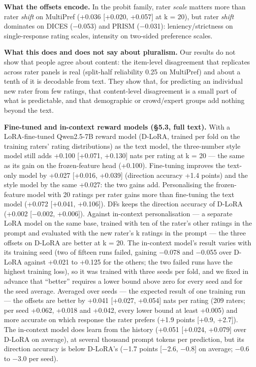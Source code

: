 \documentclass{article}
\begin{document}
\textbf{What the offsets encode.} In the probit family, rater \emph{scale} matters more than rater \emph{shift} on MultiPref (+0.036 {[}+0.020, +0.057{]} at k = 20), but rater \emph{shift} dominates on DICES ($-$0.053) and PRISM ($-$0.031): leniency/strictness on single-response rating scales, intensity on two-sided preference scales.

\textbf{What this does and does not say about pluralism.} Our results do not show that people agree about content: the item-level disagreement that replicates across rater panels is real (split-half reliability 0.25 on MultiPref) and about a tenth of it is decodable from text. They show that, for predicting an individual new rater from few ratings, that content-level disagreement is a small part of what is predictable, and that demographic or crowd/expert groups add nothing beyond the text.

\textbf{Fine-tuned and in-context reward models (\S{}5.3, full text).} With a LoRA-fine-tuned Qwen2.5-7B reward model (D-LoRA, trained per fold on the training raters' rating distributions) as the text model, the three-number style model still adds +0.100 {[}+0.071, +0.130{]} nats per rating at k = 20 --- the same as its gain on the frozen-feature head (+0.100). Fine-tuning improves the text-only model by +0.027 {[}+0.016, +0.039{]} (direction accuracy +1.4 points) and the style model by the same +0.027: the two gains add. Personalising the frozen-feature model with 20 ratings per rater gains more than fine-tuning the text model (+0.072 {[}+0.041, +0.106{]}). DFs keeps the direction accuracy of D-LoRA (+0.002 {[}$-$0.002, +0.006{]}). Against in-context personalisation --- a separate LoRA model on the same base, trained with ten of the rater's other ratings in the prompt and evaluated with the new rater's k ratings in the prompt --- the three offsets on D-LoRA are better at k = 20. The in-context model's result varies with its training seed (two of fifteen runs failed, gaining $-$0.078 and $-$0.055 over D-LoRA against +0.021 to +0.125 for the others; the two failed runs have the highest training loss), so it was trained with three seeds per fold, and we fixed in advance that ``better'' requires a lower bound above zero for every seed and for the seed average. Averaged over seeds --- the expected result of one training run --- the offsets are better by +0.041 {[}+0.027, +0.054{]} nats per rating (209 raters; per seed +0.062, +0.018 and +0.042, every lower bound at least +0.005) and more accurate on which response the rater prefers (+1.9 points {[}+0.9, +2.7{]}). The in-context model does learn from the history (+0.051 {[}+0.024, +0.079{]} over D-LoRA on average), at several thousand prompt tokens per prediction, but its direction accuracy is below D-LoRA's ($-$1.7 points {[}$-$2.6, $-$0.8{]} on average; $-$0.6 to $-$3.0 per seed).
\end{document}
